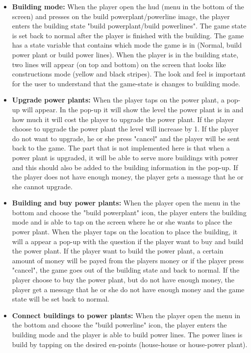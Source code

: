 	\begin{itemize}
		\item {\bf Building mode:} When the player open the hud (menu in the bottom of the screen) and presses
		on the build powerplant/powerline image, the player enters the building state 
		"build powerplant/build powerlines". The game state is set back to normal after the player 
		is finished with the building. The game has a state variable that contains which mode the 
		game is in (Normal, build power plant or build power lines). When the player is in the building
		state, two lines will appear (on top and bottom) on the screen that looks like constructions mode
		(yellow and black stripes). The look and feel is important for the user to understand that
		the game-state is changes to building mode. 

		\item {\bf Upgrade power plants:} When the player taps on the power plant, a pop-up will appear.
		In the pop-up it will show the level the power plant is in and how much it will cost the 
		player to upgrade the power plant. If the player choose to upgrade the power plant the level will
		increase by 1. If the player do not want to upgrade, he or she press "cancel" and the player will be sent
		back to the game. The part that is not implemented here is that when a power plant is upgraded, 
		it will be able to serve more buildings with power and this should also be added to the building 
		information in the pop-up. If the player does not have enough money, the player gets a message 
		that he or she cannot upgrade.

		\item {\bf Building and buy power plants:} When the player open the menu in the bottom and 
		choose the "build powerplant" icon, the player enters the building mode and is able to 
		tap on the screen where he or she wants to place the power plant. When the player taps on the
		location to place the building, it will a appear a pop-up with the question if the player 
		want to buy and build the power plant. If the player want to build the power plant, a certain
		amount of money will be payed from the players money or if the player press "cancel", the 
		game goes out of the building state and back to normal. If the player choose to buy the 
		power plant, but do not have enough money, the player get a message that he or she do not have
		enough money and the game state will be set back to normal. 

		\item {\bf Connect buildings to power plants:} When the player open the menu in the bottom and 
		choose the "build powerline" icon, the player enters the building mode and the player is able
		to build power lines. The power lines is build by tapping on the desired en-points (house-house 
		or house-power plant).


\end{itemize}
